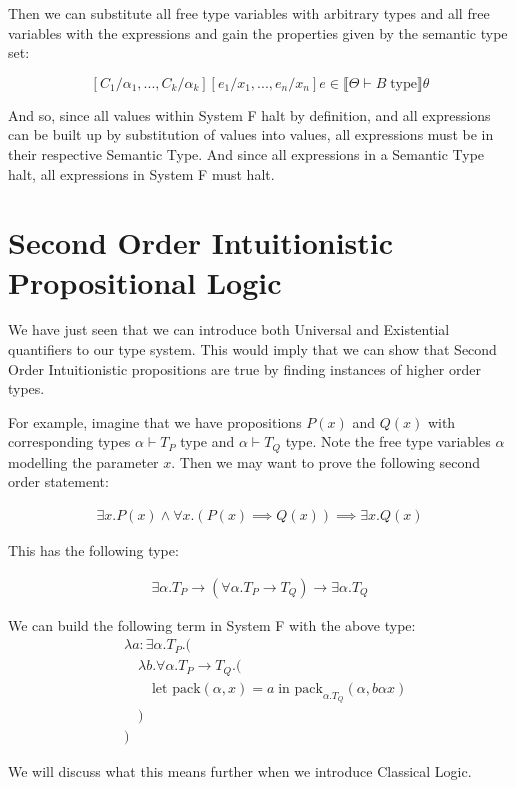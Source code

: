 \documentclass{article}
\newcommand{\inlineeq}[1]{
    \vspace{-2em}
    \begin{gather*}
    #1
    \end{gather*}
    \vspace{-2em}
}
\begin{document}
Then we can substitute all free type variables with arbitrary types and all free variables with the expressions and gain the properties given by the semantic type set:

$$[C_1/\alpha_1, ..., C_k/\alpha_k][e_1/x_1, ..., e_n/x_n]e\in \llbracket \Theta \vdash B \; \textrm{type} \rrbracket \theta$$ 

And so, since all values within System F halt by definition, and all expressions can be built up by substitution of values into values, all expressions must be in their respective Semantic Type. And since all expressions in a Semantic Type halt, all expressions in System F must halt.

\newpage
\section{Second Order Intuitionistic Propositional Logic}

We have just seen that we can introduce both Universal and Existential quantifiers to our type system. This would imply that we can show that Second Order Intuitionistic propositions are true by finding instances of higher order types.

For example, imagine that we have propositions $P(x)$ and $Q(x)$ with corresponding types $\alpha \vdash T_P$ type and $\alpha \vdash T_Q$ type. Note the free type variables $\alpha$ modelling the parameter $x$. Then we may want to prove the following second order statement:

\inlineeq{\exists x. P(x) \land \forall x. (P(x) \implies Q(x)) \implies \exists x. Q(x)}

This has the following type:

\inlineeq{\exists \alpha. T_P \to (\forall \alpha. T_P \to T_Q) \to \exists \alpha. T_Q}

We can build the following term in System F with the above type:
\begin{equation*}
\begin{split}
&\lambda a : \exists \alpha. T_P. (\\
&\quad\lambda b. \forall \alpha. T_P \to T_Q. (\\
&\qquad\textrm{let pack}(\alpha, x) = a \; \textrm{in pack}_{\alpha.T_Q}(\alpha, b \alpha x)\\
&\quad)\\
&)
\end{split}
\end{equation*}

We will discuss what this means further when we introduce Classical Logic.
\end{document}
